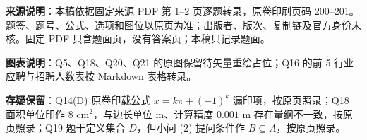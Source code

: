 


\begin{gktip}
\textbf{来源说明}：本稿依据固定来源 PDF 第 1–2 页逐题转录，原卷印刷页码 200–201。题签、题号、公式、选项和图位以原页为准；出版者、版次、复制链及官方身份未核。固定 PDF 只含题面页，没有答案页；本稿只记录题面。

\textbf{图表说明}：Q5、Q18、Q20、Q21 的原图保留待矢量重绘占位；Q16 的前 5 行业应聘与招聘人数表按 Markdown 表格转录。

\textbf{存疑保留}：Q14(D) 原卷印载公式 $x = k\pi + (-1)^k$ 漏印项，按原页照录；Q18 面积单位印作 $8\text{ cm}^2$，与边长单位 $\text{m}$、计算精度 $0.001\text{ m}$ 存在量纲不一致，按原页照录；Q19 题干定义集合 $D$，但小问 (2) 提问条件作 $B \subseteq A$，按原页照录。
\end{gktip}


